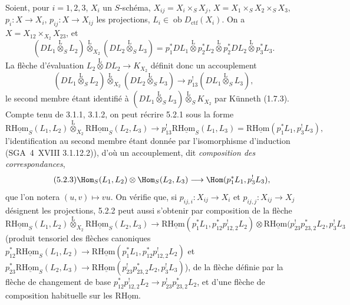 Soient, pour $i=1,2,3$, $X_i$ un $S$-schéma, $X_{ij}=X_i\times_SX_j$, $X=X_1\times_SX_2\times_SX_3$, $p_i:X\to X_i$, $p_{ij}:X\to X_{ij}$ les projections, $L_i\in\operatorname{ob}D_{\mathrm{ctf}}(X_i)$. On a $X=X_{12}\times_{X_2}X_{23}$, et
\[
(DL_1\overset{\mathrm{L}}{\otimes}_SL_2)\overset{\mathrm{L}}{\otimes}_{X_2}(DL_2\overset{\mathrm{L}}{\otimes}_SL_3)
=p_1^*DL_1\overset{\mathrm{L}}{\otimes}p_2^*L_2\overset{\mathrm{L}}{\otimes}p_2^*DL_2\overset{\mathrm{L}}{\otimes}p_3^*L_3.
\]
La flèche d'évaluation $L_2\overset{\mathrm{L}}{\otimes}DL_2\to K_{X_2}$ définit donc un accouplement
\begin{equation}
\tag{5.2.1}
(DL_1\overset{\mathrm{L}}{\otimes}_SL_2)\overset{\mathrm{L}}{\otimes}_{X_2}(DL_2\overset{\mathrm{L}}{\otimes}_SL_3)\longrightarrow p_{13}^!(DL_1\overset{\mathrm{L}}{\otimes}_SL_3),
\end{equation}
le second membre étant identifié à $(DL_1\overset{\mathrm{L}}{\otimes}_SL_3)\overset{\mathrm{L}}{\otimes}_SK_{X_2}$ par Künneth (1.7.3). Compte tenu de 3.1.1, 3.1.2, on peut récrire 5.2.1 sous la forme
\begin{equation}
\tag{5.2.2}
\mathrm{R}\underline{\mathrm{Hom}}_S(L_1,L_2)\overset{\mathrm{L}}{\otimes}_{X_2}\mathrm{R}\underline{\mathrm{Hom}}_S(L_2,L_3)\longrightarrow p_{13}^!\mathrm{R}\underline{\mathrm{Hom}}_S(L_1,L_3)=\mathrm{R}\underline{\mathrm{Hom}}(p_1^*L_1,p_3^!L_3),
\end{equation}
l'identification au second membre étant donnée par l'isomorphisme d'induction (SGA~4~XVIII 3.1.12.2)), d'où un accouplement, dit \emph{composition des correspondances},
\begin{equation}
\tag{5.2.3}
\Hom_S(L_1,L_2)\otimes\Hom_S(L_2,L_3)\longrightarrow\Hom(p_1^*L_1,p_3^!L_3),
\end{equation}
que l'on notera $(u,v)\mapsto vu$. On vérifie que, si $p_{ij,i}:X_{ij}\to X_i$ et $p_{ij,j}:X_{ij}\to X_j$ désignent les projections, 5.2.2 peut aussi s'obtenir par composition de la flèche
\[
\mathrm{R}\underline{\mathrm{Hom}}_S(L_1,L_2)\overset{\mathrm{L}}{\otimes}_{X_2}\mathrm{R}\underline{\mathrm{Hom}}_S(L_2,L_3)
\longrightarrow
\mathrm{R}\underline{\mathrm{Hom}}(p_1^*L_1,p_{12}^*p_{12,2}^!L_2)
\otimes
\mathrm{R}\underline{\mathrm{Hom}}(p_{23}^!p_{23,2}^*L_2,p_3^!L_3
\]
(produit tensoriel des flèches canoniques $p_{12}^*\mathrm{R}\underline{\mathrm{Hom}}_S(L_1,L_2)\to\mathrm{R}\underline{\mathrm{Hom}}(p_1^*L_1,p_{12}^*p_{12,2}^!L_2)$ et $p_{23}^*\mathrm{R}\underline{\mathrm{Hom}}_S(L_2,L_3)\to\mathrm{R}\underline{\mathrm{Hom}}(p_{23}^!p_{23,2}^*L_2,p_3^!L_3)$), de la flèche définie par la flèche de changement de base $p_{12}^*p_{12,2}^!L_2\to p_{23}^!p_{23,2}^*L_2$, et d'une flèche de composition habituelle sur les $\mathrm{R}\underline{\mathrm{Hom}}$.

